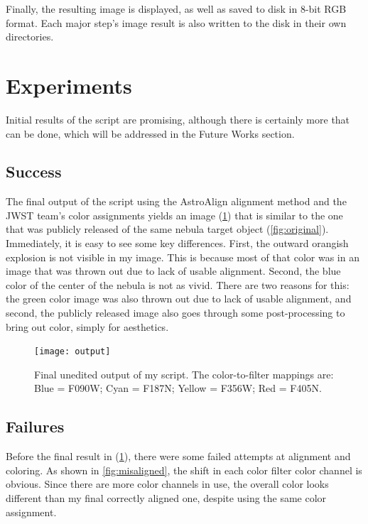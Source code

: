 \documentclass[10pt,twocolumn,letterpaper]{article}
\begin{document}
Finally, the resulting image is displayed, as well as saved to disk in 8-bit RGB format. Each major step's image result is also written to the disk in their own directories.

\section{Experiments}
\label{sec:exp}

Initial results of the script are promising, although there is certainly more that can be done, which will be addressed in the Future Works section.

\subsection{Success}

The final output of the script using the AstroAlign alignment method and the JWST team's color assignments yields an image (\cref{fig:output}) that is similar to the one that was publicly released of the same nebula target object (\cref{fig:original}). Immediately, it is easy to see some key differences. First, the outward orangish explosion is not visible in my image. This is because most of that color was in an image that was thrown out due to lack of usable alignment. Second, the blue color of the center of the nebula is not as vivid. There are two reasons for this: the green color image was also thrown out due to lack of usable alignment, and second, the publicly released image also goes through some post-processing to bring out color, simply for aesthetics.

\begin{figure}[t]
  \centering
  \texttt{[image: output]}
  \caption{Final unedited output of my script. The color-to-filter mappings are: Blue = F090W; Cyan = F187N; Yellow = F356W; Red = F405N.}
  \label{fig:output}
\end{figure}

\subsection{Failures}

Before the final result in (\cref{fig:output}), there were some failed attempts at alignment and coloring. As shown in \cref{fig:misaligned}, the shift in each color filter color channel is obvious. Since there are more color channels in use, the overall color looks different than my final correctly aligned one, despite using the same color assignment.
\end{document}
